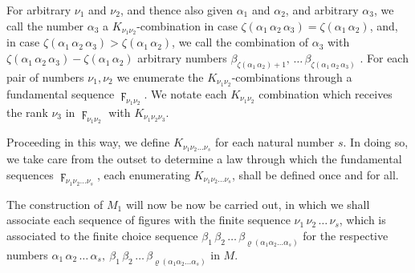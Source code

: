 \documentclass{amsart}
\newcommand\Rank[1]{\varrho\left(#1\right)}
\newcommand\Max[1]{\zeta\left(#1\right)}
\begin{document}
For arbitrary $\nu_1$ and $\nu_2$, and thence also given $\alpha_1$ and
$\alpha_2$, and arbitrary $\alpha_3$, we call the number $\alpha_3$ a
$K_{\nu_1\nu_2}$-combination in case $\Max{\alpha_1\,\alpha_2\,\alpha_3} =
\Max{\alpha_1\,\alpha_2}$, and, in case $\Max{\alpha_1\,\alpha_2\,\alpha_3} >
\Max{\alpha_1\,\alpha_2}$, we  call the combination of
$\alpha_3$ with $\Max{\alpha_1\,\alpha_2\,\alpha_3} - \Max{\alpha_1\,\alpha_2}$
arbitrary numbers $\beta_{\Max{\alpha_1\,\alpha_2} +
1},\,\dots\,\beta_{\Max{\alpha_1\,\alpha_2\,\alpha_3}}$ . For each pair of numbers $\nu_1, \nu_2$ we
enumerate the $K_{\nu_1\nu_2}$-combinations through a fundamental sequence
$\digamma_{\nu_1\nu_2}$. We notate each $K_{\nu_1\nu_2}$ combination which
receives the rank $\nu_3$ in $\digamma_{\nu_1\nu_2}$ with
$K_{\nu_1\nu_2\nu_3}$.

Proceeding in this way, we define $K_{\nu_1\nu_2\dots\nu_s}$ for each natural
number $s$. In doing so, we take care from the outset to determine a
law through which the fundamental sequences $\digamma_{\nu_1\nu_2\dots\nu_s}$,
each enumerating $K_{\nu_1\nu_2\dots\nu_s}$, shall be defined once and for all.

The construction of $M_1$ will now be now be carried out, in which we shall
associate each sequence of figures with the finite sequence
$\nu_1\,\nu_2\,\dots\,\nu_s$, which is associated to the finite choice sequence
$\beta_1\,\beta_2\,\dots\,\beta_{\Rank{\alpha_1\alpha_2\dots\alpha_s}}$ for the
respective numbers $\alpha_1\,\alpha_2\,\dots\,\alpha_s,\
\beta_1\,\beta_2\,\dots\,\beta_{\Rank{\alpha_1\alpha_2\dots\alpha_s}}$ in $M$.

\bigskip
\end{document}
